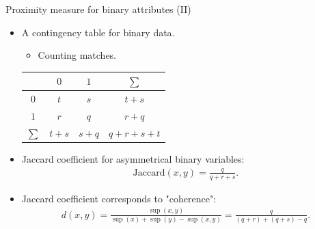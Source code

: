 \documentclass[aspectratio=169,t]{beamer}
\begin{document}
  { 
    \begin{frame}{Proximity measure for binary attributes (II)}
    \begin{itemize}
      \item A contingency table for binary data.
      \begin{itemize}
        \item Counting matches.
      \end{itemize}
      \begin{center}
        \begin{tabular}{ c | c c c }
         & $0$ & $1$ & $\sum$ \\ \hline
         $0$ & $t$ & $s$ & $t+s$\\  
         $1$ & $r$ & $q$ & $r+q$\\
         $\sum$ & $t+s$ & $s+q$ & $q+r+s+t$   
        \end{tabular}
      \end{center}
      \item Jaccard coefficient for asymmetrical binary variables:
      \begin{align}
        \text{Jaccard}(x,y) = \frac{q}{q+r+s}.
      \end{align}
      \item Jaccard coefficient corresponds to "coherence":
      \begin{align}
        d(x,y) = \frac{\sup(x,y)}{\sup(x) + \sup(y) - \sup(x,y)} = \frac{q}{(q+r)+(q+s)-q}.
      \end{align}
    \end{itemize}
    \end{frame}
  }
\end{document}
